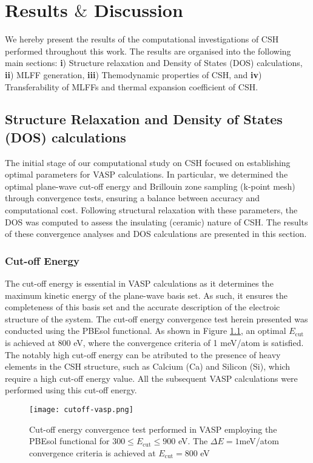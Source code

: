 \chapter{\texorpdfstring{Results $\&$ Discussion}{Results \& Discussion}}
\label{Chapter4}
We hereby present the results of the computational investigations of CSH performed throughout this work. The results are organised into the following main sections: \textbf{i}) Structure relaxation and Density of States (DOS) calculations, \textbf{ii}) MLFF generation, \textbf{iii}) Themodynamic properties of CSH, and \textbf{iv}) Transferability of MLFFs and thermal expansion coefficient of CSH. 
 
\section{Structure Relaxation and Density of States (DOS) calculations}
\label{sec:bulk-params-dos}
The initial stage of our computational study on CSH focused on establishing optimal parameters for VASP calculations. In particular, we determined the optimal plane-wave cut-off energy and Brillouin zone sampling (k-point mesh) through convergence tests, ensuring a balance between accuracy and computational cost. Following structural relaxation with these parameters, the DOS was computed to assess the insulating (ceramic) nature of CSH. The results of these convergence analyses and DOS calculations are presented in this section.
\subsection{Cut-off Energy}
The cut-off energy is essential in VASP calculations as it determines the maximum kinetic energy of the plane-wave basis set. As such, it ensures the completeness of this basis set and the accurate description of the electroic structure of the system.  The cut-off energy convergence test herein presented was conducted using the PBEsol functional. As shown in Figure \ref{cutoff-energy}, an optimal $E_{\text{cut}}$ is achieved at 800 eV, where the convergence criteria of 1 meV/atom is satisfied. The notably high cut-off energy can be atributed to the presence of heavy elements in the CSH structure, such as Calcium (Ca) and Silicon (Si), which require a high cut-off energy value\supercite{zotero-item-698}. All the subsequent VASP calculations were performed using this cut-off energy.
\begin{figure}[H]
    \centering
    \texttt{[image: cutoff-vasp.png]}
    \caption{
    Cut-off energy convergence test performed in VASP employing the PBEsol functional for $300 \leq E_{\text{cut}} \leq 900$ eV. The $\Delta E = 1$meV/atom convergence criteria is achieved at $E_{\text {cut}} = 800$ eV}
    \label{cutoff-energy}
\end{figure}

